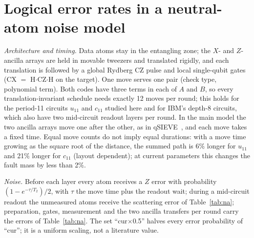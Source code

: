 \documentclass[aps,prl,twocolumn,superscriptaddress,nofootinbib]{revtex4-2}
\newif\ifshowclaimtags \showclaimtagsfalse
\newcommand{\cl}[1]{\ifshowclaimtags\textsuperscript{\textcolor{blue}{\scriptsize[#1]}}\fi}
\begin{document}
\section{Logical error rates in a neutral-atom noise model}\label{sm:na}\cl{L-19}
\emph{Architecture and timing.} Data atoms stay in the entangling zone; the $X$- and
$Z$-ancilla arrays are held in movable tweezers and translated rigidly, and each translation
is followed by a global Rydberg CZ pulse and local single-qubit gates (CX $=$
H$\cdot$CZ$\cdot$H on the target). One move serves one pair (check type, polynomial term).
Both codes have three terms in each of $A$ and $B$, so every translation-invariant schedule
needs exactly 12 moves per round; this holds for the period-11 circuits $u_{11}$ and
$c_{11}$ studied here and for IBM's depth-8 circuits, which also have two mid-circuit
readout layers per round. In the main model the two ancilla arrays move one after the
other, as in qSIEVE~\cite{Viszlai2026}, and each move takes a fixed time. Equal move counts
do not imply equal durations: with a move time growing as the square root of the distance,
the summed path is 6\% longer for $u_{11}$ and 21\% longer for $c_{11}$ (layout dependent);
at current parameters this changes the fault mass by less than 2\%.

\emph{Noise.} Before each layer every atom receives a $Z$ error with probability
$(1-e^{-\tau/T_2})/2$, with $\tau$ the move time plus the readout wait; during a mid-circuit
readout the unmeasured atoms receive the scattering error of Table~\ref{tab:na};
preparation, gates, measurement and the two ancilla transfers per round carry the errors of
Table~\ref{tab:na}. The set ``cur$\times$0.5'' halves every error probability of ``cur''; it
is a uniform scaling, not a literature value.
\end{document}
